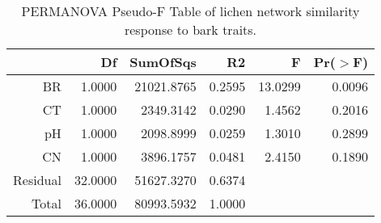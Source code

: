 \begin{table}[ht]
\centering
\begin{tabular}{rrrrrr}
  \hline
 & Df & SumOfSqs & R2 & F & Pr($>$F) \\ 
  \hline
BR & 1.0000 & 21021.8765 & 0.2595 & 13.0299 & 0.0096 \\ 
  CT & 1.0000 & 2349.3142 & 0.0290 & 1.4562 & 0.2016 \\ 
  pH & 1.0000 & 2098.8999 & 0.0259 & 1.3010 & 0.2899 \\ 
  CN & 1.0000 & 3896.1757 & 0.0481 & 2.4150 & 0.1890 \\ 
  Residual & 32.0000 & 51627.3270 & 0.6374 &  &  \\ 
  Total & 36.0000 & 80993.5932 & 1.0000 &  &  \\ 
   \hline
\end{tabular}
\caption{PERMANOVA Pseudo-F Table of lichen network similarity response to bark traits.} 
\label{tab:cn_trait_perm}
\end{table}
